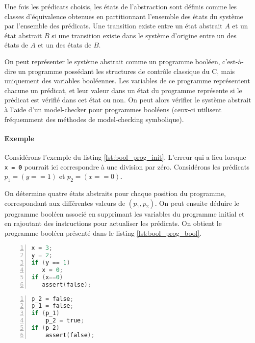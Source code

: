Une fois les prédicats choisis, les états de l'abstraction sont définis comme
les classes d'équivalence obtenues en partitionnant l'ensemble des états du
système par l'ensemble des prédicats. Une transition existe entre un état
abstrait \(A\) et un état abstrait \(B\) si une transition existe dans le
système d'origine entre un des états de \(A\) et un des états de \(B\).

On peut représenter le système abstrait comme un programme booléen, c'est-à-dire
un programme possédant les structures de contrôle classique du C, mais
uniquement des variables booléennes. Les variables de ce programme représentent
chacune un prédicat, et leur valeur dans un état du programme représente si
le prédicat est vérifié dans cet état ou non. On peut alors vérifier le système
abstrait à l'aide d'un model-checker pour programmes booléens (ceux-ci utilisent
fréquemment des méthodes de model-checking symbolique).

\paragraph{Exemple}

Considérons l'exemple du listing \ref{lst:bool_prog_init}. L'erreur qui a lieu
lorsque \texttt{x = 0} pourrait ici correspondre à une division par
zéro. Considérons les prédicats \(p_1 = (y == 1)\) et \(p_2 = (x == 0)\).

On détermine quatre états abstraits pour chaque position du programme,
correspondant aux différentes valeurs de \((p_1, p_2)\). On peut ensuite
déduire le programme booléen associé en supprimant les variables du programme
initial et en rajoutant des instructions pour actualiser les prédicats. On
obtient le programme booléen présenté dans le listing \ref{lst:bool_prog_bool}.

\noindent\begin{minipage}{.45\textwidth}
\begin{lstlisting}[language=C, caption=Code initial, frame=single, numbers=left,
    label=lst:bool_prog_init]
x = 3;
y = 2;
if (y == 1)
   x = 0;
if (x==0)
   assert(false);
\end{lstlisting}
\end{minipage}\hfill
\begin{minipage}{.45\textwidth}
\begin{lstlisting}[language=C, caption=Programme booléen,frame=single, numbers=left,
    label=lst:bool_prog_bool]
p_2 = false;
p_1 = false;
if (p_1)
    p_2 = true;
if (p_2)
    assert(false);
\end{lstlisting}
\end{minipage}

